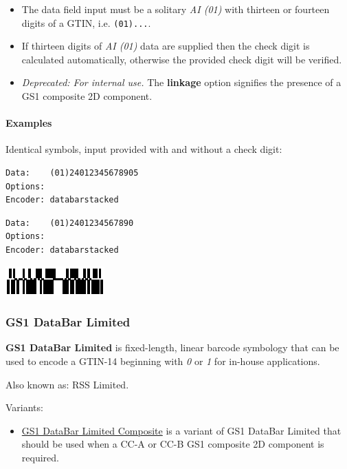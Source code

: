 \begin{itemize}
\tightlist
\item
  The data field input must be a solitary \emph{AI (01)} with thirteen
  or fourteen digits of a GTIN, i.e. \texttt{(01)...}.
\item
  If thirteen digits of \emph{AI (01)} data are supplied then the check
  digit is calculated automatically, otherwise the provided check digit
  will be verified.
\item
  \emph{Deprecated: For internal use.} The \textbf{linkage} option
  signifies the presence of a GS1 composite 2D component.
\end{itemize}

\hypertarget{examples-29}{%
\paragraph{Examples}\label{examples-29}}

Identical symbols, input provided with and without a check digit:

\begin{verbatim}
Data:    (01)24012345678905
Options: 
Encoder: databarstacked
\end{verbatim}

\begin{verbatim}
Data:    (01)2401234567890
Options: 
Encoder: databarstacked
\end{verbatim}

\includegraphics{images/databarstacked-1.eps}

\hypertarget{gs1-databar-limited}{%
\subsubsection{GS1 DataBar Limited}\label{gs1-databar-limited}}

\textbf{GS1 DataBar Limited} is fixed-length, linear barcode symbology
that can be used to encode a GTIN-14 beginning with \emph{0} or \emph{1}
for in-house applications.

Also known as: RSS Limited.

Variants:

\begin{itemize}
\tightlist
\item
  \protect\hyperlink{gs1-composite-symbols}{GS1 DataBar Limited
  Composite} is a variant of GS1 DataBar Limited that should be used
  when a CC-A or CC-B GS1 composite 2D component is required.
\end{itemize}

